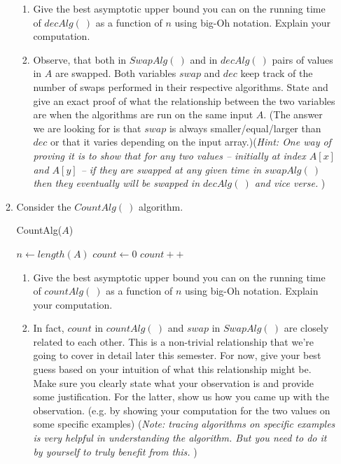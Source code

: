 \documentclass[11pt]{article}
\begin{document}
\begin{enumerate}
\begin{enumerate}
\begin{enumerate}
        \item Give the best asymptotic upper bound you can on the running time of $decAlg(\ )$ as a function of $n$ using big-Oh notation. Explain your computation.
        \item Observe, that both in $SwapAlg(\ )$ and  in $decAlg(\ )$ pairs of values in $A$ are swapped. Both variables $swap$ and $dec$ keep track of the number of swaps performed in their respective algorithms. State and give an exact proof of what the relationship between the two variables are when the algorithms are run on the same input $A$. (The answer we are looking for is that $swap$ is always smaller/equal/larger than $dec$ or that it varies depending on the input array.)(\emph{Hint: One way of proving it is to show that for any two values -- initially at index $A[x]$ and $A[y]$ --  if they are swapped at any given time in $swapAlg(\ )$ then they eventually will be swapped in $decAlg(\ )$ and vice verse. })
    \end{enumerate}
 
 \item Consider the $CountAlg(\ )$ algorithm.
 
 \begin{algorithm}[H]
      \caption{CountAlg($A$)} 
      $n \gets length(A)$ \;
      $count \gets 0$\;
      {
      {
      {
    $count ++$
    }
      }
      }
    \end{algorithm}
    
   
 
    
     \begin{enumerate}
       
        \item Give the best asymptotic upper bound you can on the running time of $countAlg(\ )$ as a function of $n$ using big-Oh notation. Explain your computation.
        \item In fact,  $count$ in $countAlg(\ )$ and $swap$ in $SwapAlg(\ )$ are closely related to each other. This is a non-trivial relationship  that we're going to cover in detail later this semester. For now, give your best guess based on your intuition of what this relationship might be. Make sure you clearly state what your observation is  and provide some justification. For the latter, show us how you came up with the observation. (e.g. by showing your computation for  the two values on some specific examples) (\emph{Note: tracing algorithms on specific examples is very helpful in understanding the algorithm. But you need to do it by yourself to truly benefit from this. })\\
        

\end{enumerate}
\end{enumerate}
\end{enumerate}
\end{document}
